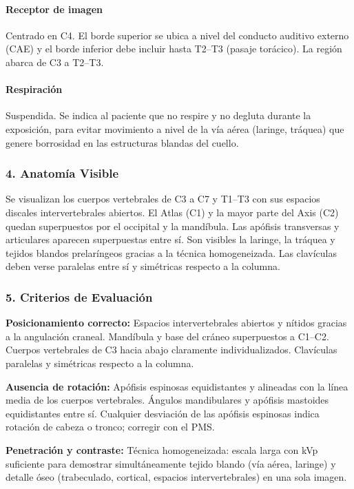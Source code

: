 		\paragraph{Receptor de imagen}
		Centrado en C4. El borde superior se ubica a nivel del conducto auditivo externo (CAE) y el borde inferior debe incluir hasta T2--T3 (pasaje torácico). La región abarca de C3 a T2--T3.
		
		\paragraph{Respiración}
		Suspendida. Se indica al paciente que no respire y no degluta durante la exposición, para evitar movimiento a nivel de la vía aérea (laringe, tráquea) que genere borrosidad en las estructuras blandas del cuello.
		
		\subsubsection*{4. Anatomía Visible}
		
		Se visualizan los cuerpos vertebrales de C3 a C7 y T1--T3 con sus espacios discales intervertebrales abiertos. El Atlas (C1) y la mayor parte del Axis (C2) quedan superpuestos por el occipital y la mandíbula. Las apófisis transversas y articulares aparecen superpuestas entre sí. Son visibles la laringe, la tráquea y tejidos blandos prelaríngeos gracias a la técnica homogeneizada. Las clavículas deben verse paralelas entre sí y simétricas respecto a la columna.
		
		\subsubsection*{5. Criterios de Evaluación}
		
		\textbf{Posicionamiento correcto:} Espacios intervertebrales abiertos y nítidos gracias a la angulación craneal. Mandíbula y base del cráneo superpuestos a C1--C2. Cuerpos vertebrales de C3 hacia abajo claramente individualizados. Clavículas paralelas y simétricas respecto a la columna.
		
		\textbf{Ausencia de rotación:} Apófisis espinosas equidistantes y alineadas con la línea media de los cuerpos vertebrales. Ángulos mandibulares y apófisis mastoides equidistantes entre sí. Cualquier desviación de las apófisis espinosas indica rotación de cabeza o tronco; corregir con el PMS.
		
		\textbf{Penetración y contraste:} Técnica homogeneizada: escala larga con kVp suficiente para demostrar simultáneamente tejido blando (vía aérea, laringe) y detalle óseo (trabeculado, cortical, espacios intervertebrales) en una sola imagen.
		
